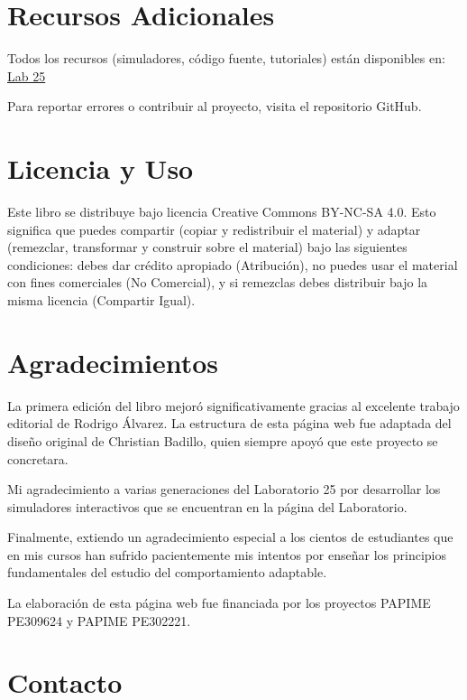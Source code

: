 \documentclass[
  letterpaper,
  DIV=11,
  numbers=noendperiod]{scrreprt}
\begin{document}
\section{Recursos Adicionales}\label{recursos-adicionales}

Todos los recursos (simuladores, código fuente, tutoriales) están
disponibles en:\\
\href{https://www.bouzaslab25.com}{Lab 25}

Para reportar errores o contribuir al proyecto, visita el repositorio
GitHub.

\section{Licencia y Uso}\label{licencia-y-uso}

Este libro se distribuye bajo licencia Creative Commons BY-NC-SA 4.0.
Esto significa que puedes compartir (copiar y redistribuir el material)
y adaptar (remezclar, transformar y construir sobre el material) bajo
las siguientes condiciones: debes dar crédito apropiado (Atribución), no
puedes usar el material con fines comerciales (No Comercial), y si
remezclas debes distribuir bajo la misma licencia (Compartir Igual).

\section{Agradecimientos}\label{agradecimientos}

La primera edición del libro mejoró significativamente gracias al
excelente trabajo editorial de Rodrigo Álvarez. La estructura de esta
página web fue adaptada del diseño original de Christian Badillo, quien
siempre apoyó que este proyecto se concretara.

Mi agradecimiento a varias generaciones del Laboratorio 25 por
desarrollar los simuladores interactivos que se encuentran en la página
del Laboratorio.

Finalmente, extiendo un agradecimiento especial a los cientos de
estudiantes que en mis cursos han sufrido pacientemente mis intentos por
enseñar los principios fundamentales del estudio del comportamiento
adaptable.

La elaboración de esta página web fue financiada por los proyectos
PAPIME PE309624 y PAPIME PE302221.

\section{Contacto}\label{contacto}
\end{document}
